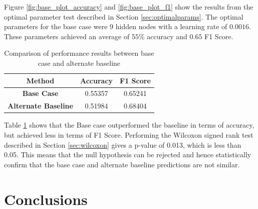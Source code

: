\documentclass{UoYCSproject}
\begin{document}
Figure \ref{fig:base_plot_accuracy} and \ref{fig:base_plot_f1} show the results from the optimal parameter test described in Section \ref{sec:optimalparams}. The optimal parameters for the base case were $9$ hidden nodes with a learning rate of $0.0016$. These parameters achieved an average of $55$\% accuracy and $0.65$ F1 Score.

\begin{table}[h]
    \centering
    \begin{tabular}{|c|c|c|} \hline
        \textbf{Method} & \textbf{Accuracy} & \textbf{F1 Score} \\ \hline
        \textbf{Base Case} & 0.55357 & 0.65241 \\
        \textbf{Alternate Baseline} & 0.51984 & 0.68404 \\
        \hline
    \end{tabular}
    \caption{Comparison of performance results between base case and alternate baseline}
    \label{tab:basecase_results}
\end{table}

Table \ref{tab:basecase_results} shows that the Base case outperformed the baseline in terms of accuracy, but achieved less in terms of F1 Score. Performing the Wilcoxon signed rank test described in Section \ref{sec:wilcoxon} gives a p-value of 0.013, which is less than 0.05. This means that the null hypothesis can be rejected and hence statistically confirm that the base case and alternate baseline predictions are not similar. 

\chapter{Conclusions}
\printbibliography
\end{document}
